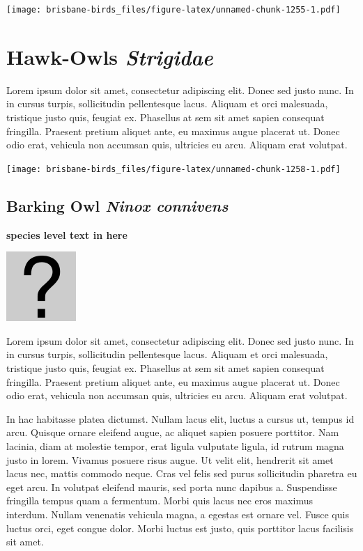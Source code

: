 \documentclass[]{book}
\let\origfigure\figure
\let\endorigfigure\endfigure
\renewenvironment{figure}[1][2] {
  \expandafter\origfigure\expandafter[H]
} {
  \endorigfigure
}
\begin{document}
\begin{figure}
\centering
\texttt{[image: brisbane-birds\_files/figure-latex/unnamed-chunk-1255-1.pdf]}
\caption{\label{fig:unnamed-chunk-1255}insert figure caption}
\end{figure}

\chapter{\texorpdfstring{Hawk-Owls
\emph{Strigidae}}{Hawk-Owls Strigidae}}\label{hawk-owls-strigidae}

Lorem ipsum dolor sit amet, consectetur adipiscing elit. Donec sed justo
nunc. In in cursus turpis, sollicitudin pellentesque lacus. Aliquam et
orci malesuada, tristique justo quis, feugiat ex. Phasellus at sem sit
amet sapien consequat fringilla. Praesent pretium aliquet ante, eu
maximus augue placerat ut. Donec odio erat, vehicula non accumsan quis,
ultricies eu arcu. Aliquam erat volutpat.

\texttt{[image: brisbane-birds\_files/figure-latex/unnamed-chunk-1258-1.pdf]}

\section{\texorpdfstring{Barking Owl \emph{Ninox
connivens}}{Barking Owl Ninox connivens}}\label{barking-owl-ninox-connivens}

\textbf{species level text in here}

\begin{figure}
\centering
\includegraphics{assets/missing.png}
\caption{No image for species}
\end{figure}

Lorem ipsum dolor sit amet, consectetur adipiscing elit. Donec sed justo
nunc. In in cursus turpis, sollicitudin pellentesque lacus. Aliquam et
orci malesuada, tristique justo quis, feugiat ex. Phasellus at sem sit
amet sapien consequat fringilla. Praesent pretium aliquet ante, eu
maximus augue placerat ut. Donec odio erat, vehicula non accumsan quis,
ultricies eu arcu. Aliquam erat volutpat.

In hac habitasse platea dictumst. Nullam lacus elit, luctus a cursus ut,
tempus id arcu. Quisque ornare eleifend augue, ac aliquet sapien posuere
porttitor. Nam lacinia, diam at molestie tempor, erat ligula vulputate
ligula, id rutrum magna justo in lorem. Vivamus posuere risus augue. Ut
velit elit, hendrerit sit amet lacus nec, mattis commodo neque. Cras vel
felis sed purus sollicitudin pharetra eu eget arcu. In volutpat eleifend
mauris, sed porta nunc dapibus a. Suspendisse fringilla tempus quam a
fermentum. Morbi quis lacus nec eros maximus interdum. Nullam venenatis
vehicula magna, a egestas est ornare vel. Fusce quis luctus orci, eget
congue dolor. Morbi luctus est justo, quis porttitor lacus facilisis sit
amet.
\end{document}
